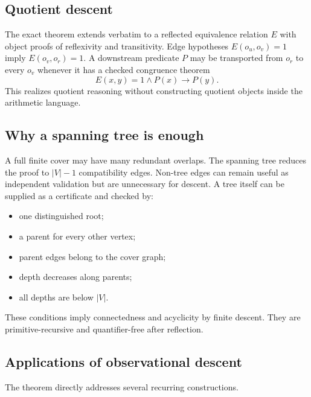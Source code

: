 \subsection{Quotient descent}

The exact theorem extends verbatim to a reflected equivalence relation \(E\) with object proofs of reflexivity and transitivity.  Edge hypotheses \(E(o_u,o_v)=1\) imply \(E(o_v,o_r)=1\).  A downstream predicate \(P\) may be transported from \(o_r\) to every \(o_v\) whenever it has a checked congruence theorem
\[
 E(x,y)=1\wedge P(x)\to P(y).
\]
This realizes quotient reasoning without constructing quotient objects inside the arithmetic language.

\subsection{Why a spanning tree is enough}

A full finite cover may have many redundant overlaps.  The spanning tree reduces the proof to \(|V|-1\) compatibility edges.  Non-tree edges can remain useful as independent validation but are unnecessary for descent.  A tree itself can be supplied as a certificate and checked by:
\begin{itemize}[leftmargin=2em]
\item one distinguished root;
\item a parent for every other vertex;
\item parent edges belong to the cover graph;
\item depth decreases along parents;
\item all depths are below \(|V|\).
\end{itemize}
These conditions imply connectedness and acyclicity by finite descent.  They are primitive-recursive and quantifier-free after reflection.

\subsection{Applications of observational descent}

The theorem directly addresses several recurring constructions.

